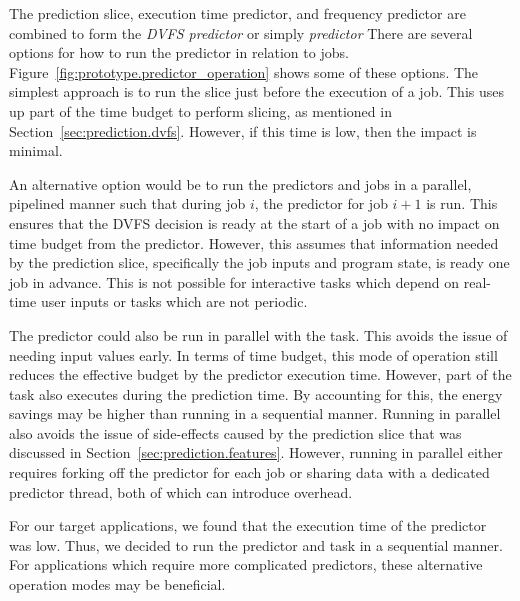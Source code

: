 The prediction slice, execution time predictor, and frequency predictor are
combined to form the \emph{DVFS predictor} or simply \emph{predictor}
There are several options for how to run the predictor in relation to jobs.
Figure~\ref{fig:prototype.predictor_operation} shows some of these options. 
The simplest approach is to run the slice just before the execution of
a job. This uses up part of the time budget to perform slicing, as mentioned
in Section~\ref{sec:prediction.dvfs}. However, if this time is low, then the
impact is minimal.


An alternative option would be to run the predictors and jobs in a parallel,
pipelined manner such that during job $i$, the predictor for job
$i+1$ is run. This ensures that the DVFS decision is ready at the start of a job with
no impact on time budget from the predictor.
However, this assumes that information needed by the prediction slice, 
specifically the job inputs and program state, 
is ready one job in advance. This is not possible for interactive
tasks which depend on real-time user inputs or tasks which are not
periodic.

The predictor could also be run in parallel with the task. This avoids
the issue of needing input values early.  In terms of time budget, this mode of
operation still reduces the effective budget by the predictor execution time.
However, part of the task also executes during the prediction time. By
accounting for this, the energy savings may be higher than running in a
sequential manner.  Running in parallel also avoids the issue of side-effects
caused by the prediction slice that was discussed in
Section~\ref{sec:prediction.features}. However, running in parallel either
requires forking off the predictor for each job or sharing data with a
dedicated predictor thread, both of which can introduce overhead.

For our target applications, we found that the execution time of the predictor
was low. Thus, we decided to run the predictor and task in a sequential
manner. For applications which require more complicated predictors, these
alternative operation modes may be beneficial.

